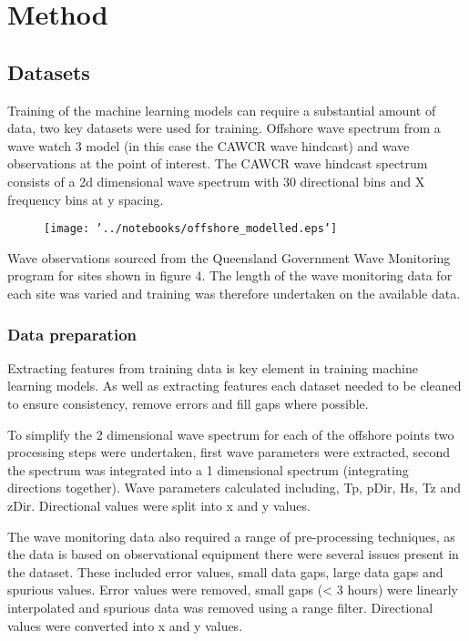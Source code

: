 \documentclass[a4paper,fleqn]{cas-sc}
\begin{document}
\section{Method}\label{method}

\subsection{Datasets}
Training of the machine learning models can require a substantial amount of data, two key datasets were used for training. Offshore wave spectrum from a wave watch 3 model (in this case the CAWCR wave hindcast) and wave observations at the point of interest. The CAWCR wave hindcast spectrum consists of a 2d dimensional wave spectrum with 30 directional bins and X frequency bins at y spacing.

\begin{figure}[<options>]
	\centering
		\texttt{[image: '../notebooks/offshore\_modelled.eps']}
	  \caption{}\label{fig1}
\end{figure}

Wave observations sourced from the Queensland Government Wave Monitoring program for sites shown in figure 4. The length of the wave monitoring data for each site was varied and training was therefore undertaken on the available data.

\subsubsection{Data preparation}
Extracting features from training data is key element in training machine learning models. As well as extracting features each dataset needed to be cleaned to ensure consistency, remove errors and fill gaps where possible. 

To simplify the 2 dimensional wave spectrum for each of the offshore points two processing steps were undertaken, first wave parameters were extracted, second the spectrum was integrated into a 1 dimensional spectrum (integrating directions together). Wave parameters calculated including, Tp, pDir, Hs, Tz and zDir. Directional values were split into x and y values.

The wave monitoring data also required a range of pre-processing techniques, as the data is based on observational equipment there were several issues present in the dataset. These included error values, small data gaps, large data gaps and spurious values. Error values were removed, small gaps (< 3 hours) were linearly interpolated and spurious data was removed using a range filter. Directional values were converted into x and y values. 
\end{document}
